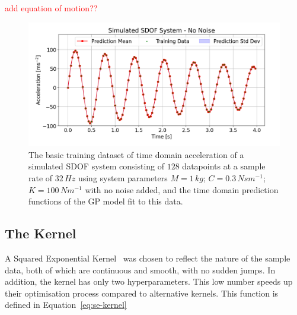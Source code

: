 \documentclass[12pt]{article}
\begin{document}
%

    \textcolor{red}{add equation of motion??}


    \begin{figure}[h]
        \centering
        \includegraphics[width=1.0\linewidth]{figures/basic-data-time-domain/basic-data-time-domain.png}
        \caption{The basic training dataset of time domain acceleration of a simulated SDOF system consisting of $128$ datapoints at a sample rate of $32 \, Hz$ using system parameters $M = 1 \, kg$; $C = 0.3 \, Nsm^{-1}$; $K = 100 \, Nm^{-1}$ with no noise added, and the time domain prediction functions of the GP model fit to this data.}
        \label{fig:basic-data-time-domain}
    \end{figure}


    \subsection{The Kernel}
    A Squared Exponential Kernel~\cite{duvenaud2014kernel} was chosen to reflect the nature of the sample data, both of which are continuous and smooth, with no sudden jumps.
    In addition, the kernel has only two hyperparameters.
    This low number speeds up their optimisation process compared to alternative kernels.
    This function is defined in Equation~\ref{eq:se-kernel}
\end{document}
